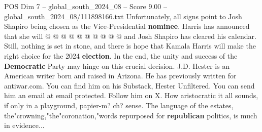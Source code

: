 \begin{textsample}{POS Dim 7 – global\_south\_2024\_08 – Score 9.00 – global\_south\_2024\_08/111898166.txt}
Unfortunately, all signs point to Josh Shapiro being chosen as the Vice-Presidential \textbf{nominee}.
Harris has announced that she will @ @ @ @ @ @ @ @ @ @ and Josh Shapiro has cleared his calendar.
Still, nothing is set in stone, and there is hope that Kamala Harris will make the right choice for the 2024 \textbf{election}.
In the end, the unity and success of the \textbf{Democratic} Party may hinge on this crucial decision.
J.D.
Hester is an American writer born and raised in Arizona.
He has previously written for antiwar.com.
You can find him on his Substack, Hester Unfiltered.
You can send him an email at email protected.
Follow him on X.
How aristocratic it all sounds, if only in a playground, papier-m? ch? sense.
The language of the estates, the"crowning,"the"coronation,"words repurposed for \textbf{republican} politics, is much in evidence...

\end{textsample}
